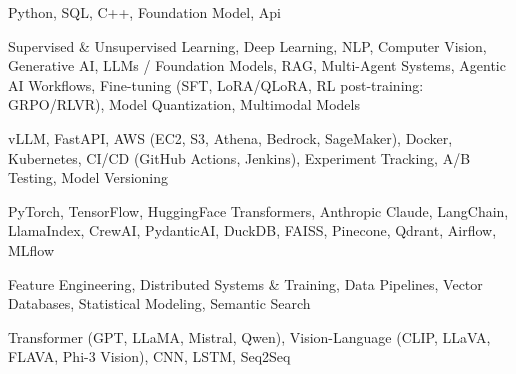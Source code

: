\documentclass[letter,10pt]{article}
\begin{document}
 Python, SQL, C++, Foundation Model, Api\par\vspace{2pt}

 Supervised \& Unsupervised Learning, Deep Learning, NLP, Computer Vision, Generative AI, LLMs / Foundation Models, RAG, Multi-Agent Systems, Agentic AI Workflows, Fine-tuning (SFT, LoRA/QLoRA, RL post-training: GRPO/RLVR), Model Quantization, Multimodal Models\par\vspace{2pt}

 vLLM, FastAPI, AWS (EC2, S3, Athena, Bedrock, SageMaker), Docker, Kubernetes, CI/CD (GitHub Actions, Jenkins), Experiment Tracking, A/B Testing, Model Versioning\par\vspace{2pt}

 PyTorch, TensorFlow, HuggingFace Transformers, Anthropic Claude, LangChain, LlamaIndex, CrewAI, PydanticAI, DuckDB, FAISS, Pinecone, Qdrant, Airflow, MLflow\par\vspace{2pt}

 Feature Engineering, Distributed Systems \& Training, Data Pipelines, Vector Databases, Statistical Modeling, Semantic Search\par\vspace{2pt}

 Transformer (GPT, LLaMA, Mistral, Qwen), Vision-Language (CLIP, LLaVA, FLAVA, Phi-3 Vision), CNN, LSTM, Seq2Seq
\end{document}
